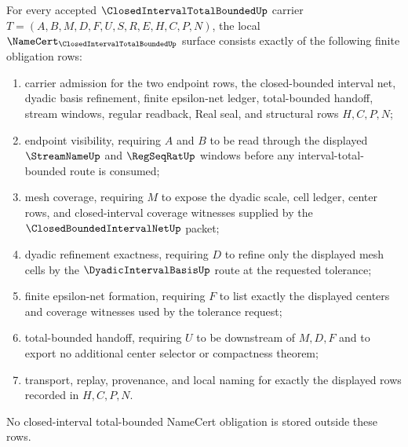 \begin{theorem}
\label{thm:closed-interval-total-bounded-namecert-obligations}
For every accepted $\ClosedIntervalTotalBoundedUp$ carrier $T=(A,B,M,D,F,U,S,R,E,H,C,P,N)$, the local $\NameCert_{\ClosedIntervalTotalBoundedUp}$ surface consists exactly of the following finite obligation rows:
\begin{enumerate}
\item carrier admission for the two endpoint rows, the closed-bounded interval net, dyadic basis refinement, finite epsilon-net ledger, total-bounded handoff, stream windows, regular readback, Real seal, and structural rows $H,C,P,N$;
\item endpoint visibility, requiring $A$ and $B$ to be read through the displayed $\StreamNameUp$ and $\RegSeqRatUp$ windows before any interval-total-bounded route is consumed;
\item mesh coverage, requiring $M$ to expose the dyadic scale, cell ledger, center rows, and closed-interval coverage witnesses supplied by the $\ClosedBoundedIntervalNetUp$ packet;
\item dyadic refinement exactness, requiring $D$ to refine only the displayed mesh cells by the $\DyadicIntervalBasisUp$ route at the requested tolerance;
\item finite epsilon-net formation, requiring $F$ to list exactly the displayed centers and coverage witnesses used by the tolerance request;
\item total-bounded handoff, requiring $U$ to be downstream of $M,D,F$ and to export no additional center selector or compactness theorem;
\item transport, replay, provenance, and local naming for exactly the displayed rows recorded in $H,C,P,N$.
\end{enumerate}
No closed-interval total-bounded NameCert obligation is stored outside these rows.
\end{theorem}
